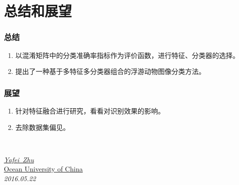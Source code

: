 \documentclass[notheorems,mathserif,table,compress]{beamer}  %
\begin{document}
\section{总结和展望}

\begin{frame}
\frametitle{总结}
\begin{enumerate}
\item 以混淆矩阵中的分类准确率指标作为评价函数，进行特征、分类器的选择。
\item 提出了一种基于多特征多分类器组合的浮游动物图像分类方法。
\end{enumerate}
\end{frame}

\begin{frame}
  \frametitle{展望}
  \begin{enumerate}
\item 针对特征融合进行研究，看看对识别效果的影响。
\item 去除数据集偏见。
  \end{enumerate}
\end{frame}

\begin{frame}
\vspace{2cm}

\\
\vspace{1.5cm}

\begin{flushright}
\emph{\href{mailto:zhuyafei4520@163.com}{\textrm {Yafei~Zhu}}}\\
\href{http://www.ouc.edu.cn}{\textrm {Ocean University of China}}\\
\emph{\textrm {2016.05.22}}
\end{flushright}  
\end{frame}
\end{document}

